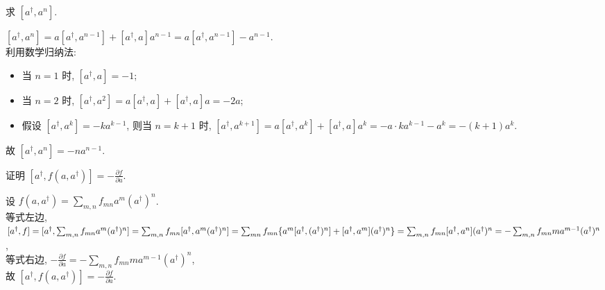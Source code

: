 \documentclass{assignment}
\begin{document}
\begin{prob}
    求 $[a^{\dagger},a^n]$.
\end{prob}
\begin{sol}
    $[a^{\dagger},a^n]=a[a^{\dagger},a^{n-1}]+[a^{\dagger},a]a^{n-1}=a[a^{\dagger},a^{n-1}]-a^{n-1}$.\\
    利用数学归纳法:
    \begin{itemize}
        \item 当 $n=1$ 时, $[a^{\dagger},a]=-1$;
        \item 当 $n=2$ 时, $[a^{\dagger},a^2]=a[a^{\dagger},a]+[a^{\dagger},a]a=-2a$;
        \item 假设 $[a^{\dagger},a^k]=-ka^{k-1}$, 则当 $n=k+1$ 时, $[a^{\dagger},a^{k+1}]=a[a^{\dagger},a^k]+[a^{\dagger},a]a^k=-a\cdot ka^{k-1}-a^k=-(k+1)a^k$.
    \end{itemize}
    故 $[a^{\dagger},a^n]=-na^{n-1}$.
\end{sol}

\begin{prob}
    证明 $[a^{\dagger},f(a,a^{\dagger})]=-\frac{\partial f}{\partial a}$.
\end{prob}
\begin{pf}
    设 $f(a,a^{\dagger})=\sum_{m,n}f_{mn}a^m(a^{\dagger})^n$.\\
    等式左边, $[a^{\dagger},f]=[a^{\dagger},\sum_{m,n}f_{mn}a^m(a^{\dagger})^n]=\sum_{m,n}f_{mn}[a^{\dagger},a^m(a^{\dagger})^n]=\sum_{mn}f_{mn}\{a^m[a^{\dagger},(a^{\dagger})^n]+[a^{\dagger},a^m](a^{\dagger})^n\}\\=\sum_{m,n}f_{mn}[a^{\dagger},a^n](a^{\dagger})^n=-\sum_{m,n}f_{mn}ma^{m-1}(a^{\dagger})^n$,\\
    等式右边, $-\frac{\partial f}{\partial a}=-\sum_{m,n}f_{mn}ma^{m-1}(a^{\dagger})^n$,\\
    故 $[a^{\dagger},f(a,a^{\dagger})]=-\frac{\partial f}{\partial a}$.
\end{pf}
\end{document}
